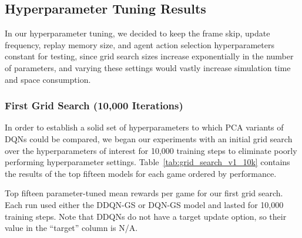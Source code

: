 \documentclass[11pt]{article}
\newcommand{\cp}{\texttt{CartPole}}
\begin{document}



\subsection{Hyperparameter Tuning Results}

In our hyperparameter tuning, we decided to keep the frame skip, update frequency, replay memory size, and agent action selection hyperparameters constant for testing, since grid search sizes increase exponentially in the number of parameters, and varying these settings would vastly increase simulation time and space consumption. 

\subsubsection{First Grid Search (10,000 Iterations)}

In order to establish a solid set of hyperparameters to which PCA variants of DQNs could be compared, we began our experiments with an initial grid search over the hyperparameters of interest for 10,000 training steps to eliminate poorly performing hyperparameter settings. Table~\ref{tab:grid_search_v1_10k} contains the results of the top fifteen models for each game ordered by performance.

\begin{table}[!ht]
    \footnotesize
    \centering
    
    
    \caption{Top fifteen parameter-tuned mean rewards per game for our first grid search. Each run used either the DDQN-GS or DQN-GS model and lasted for 10,000 training steps. Note that DDQNs do not have a target update option, so their value in the ``target'' column is N/A.}
    \label{tab:grid_search_v1_10k}
\end{table}
\end{document}
